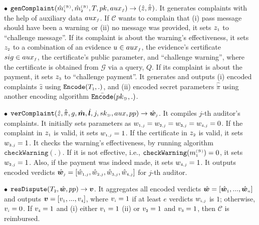 \begin{definition}
 
 \item  [$\bullet$] $\mathtt{genComplaint}(\hat m^{\scriptscriptstyle\mathcal{(B)}}_{\scriptscriptstyle 1}, \hat m^{\scriptscriptstyle\mathcal{(B)}}_{\scriptscriptstyle2}, T, pk, {aux}_{\scriptscriptstyle f})\rightarrow (\hat z, \hat{\ddot \pi})$. It  generates complaints with the help of auxiliary data ${aux}_{\scriptscriptstyle f}$.  If $\mathcal{C}$ wants to complain that (i)   pass message should have been a warning  or (ii) no  message was provided,   it sets $z_{\scriptscriptstyle 1}$ to ``challenge message''. If its complaint is about the warning's effectiveness,  it sets $z_{\scriptscriptstyle 2}$ to a combination of an evidence $u\in aux_{\scriptscriptstyle f}$, the evidence's certificate $sig\in aux_{\scriptscriptstyle f}$, the certificate's public parameter,   and ``challenge warning'', where the certificate is obtained from  $\mathcal{G}$ via a query, $Q$. If its complaint is  about the   payment, it sets $z_{\scriptscriptstyle 3}$ to ``challenge payment''. It  generates and outputs (i)  encoded complaints $\hat z$ using  $\mathtt{Encode}(T_{\scriptscriptstyle 1},.)$, and (ii) encoded secret  parameters $\hat{\ddot \pi}$  using another encoding algorithm $\bar{\mathtt{Encode}}(pk_{\scriptscriptstyle \mathcal{D}},.)$.   
%
\item  [$\bullet$] $\mathtt{verComplaint}( \hat z, \hat{\ddot{\pi}}, g, \hat{\bm m}, \hat{\bm{l}}, j, sk_{\scriptscriptstyle\mathcal D}, aux, pp)\rightarrow \hat{\bm{w}}_{\scriptscriptstyle j}$. It compiles $j$-th auditor's complaints. It initially sets parameters as  ${w}_{\scriptscriptstyle 1,j}= {w}_{\scriptscriptstyle 2, j}= {w}_{\scriptscriptstyle 3, j}= {w}_{\scriptscriptstyle 4, j}=0$. If the complaint in $ z_{\scriptscriptstyle 1}$ is valid, it sets  $w_{\scriptscriptstyle 1,j}=1$. If the certificate in $z_{\scriptscriptstyle 2}$ is valid,  it sets $ w_{\scriptscriptstyle 3,j}=1$. It  checks the warning's effectiveness, by running  algorithm $\mathtt{checkWarning}(.)$. If  it is not effective, i.e., $\mathtt{checkWarning}({m}^{\scriptscriptstyle\mathcal{(B)}}_{\scriptscriptstyle1})= 0$,  it sets  $w_{\scriptscriptstyle 2,j}=1$.  Also, if  the payment was indeed made,    it sets $w_{\scriptscriptstyle 4,j}=1$. It outputs encoded verdicts $\hat{\bm{w}}_{\scriptscriptstyle j}= [\hat {w}_{\scriptscriptstyle 1,j}, \hat{w}_{\scriptscriptstyle 2, j}, \hat{w}_{\scriptscriptstyle 3, j}, \hat{w}_{\scriptscriptstyle 4, j}]$ for $j$-th auditor. %
%
\item  [$\bullet$] $\mathtt{resDispute}(T_{\scriptscriptstyle2}, \hat{\bm{w}}, pp)\rightarrow {\bm v}$. It  aggregates all  encoded verdicts $\hat{\bm{w}}=[\hat{\bm{w}}_{\scriptscriptstyle 1},...,\hat{\bm{w}}_{\scriptscriptstyle n}]$ and outputs $\bm{v}=[v_{\scriptscriptstyle 1},..., v_{\scriptscriptstyle 4}]$, where $v_{\scriptscriptstyle i}=1$ if at least $e$   verdicts ${w}_{\scriptscriptstyle i,j}$ is $1$; otherwise, $v_{\scriptscriptstyle i}=0$. If $v_{\scriptscriptstyle 4}=1$ and (i) either $v_{\scriptscriptstyle 1}=1$ (ii) or $v_{\scriptscriptstyle 2}=1$ and $v_{\scriptscriptstyle 3}=1$,  then  $\mathcal C$  is reimbursed.
%
\end{definition}



